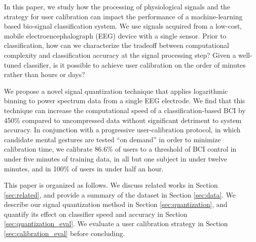 
In this paper, we study how the processing of physiological signals and the strategy for user calibration can impact the performance of a machine-learning based bio-signal classification system. We use signals acquired from a low-cost, mobile electroencephalograph (EEG) device with a single sensor. Prior to classification, how can we characterize the tradeoff between computational complexity and classification accuracy at the signal processing step? Given a well-tuned classifier, is it possible to achieve user calibration on the order of minutes rather than hours or days?


We propose a novel signal quantization technique that applies logarithmic binning to power spectrum data from a single EEG electrode. We find that this technique can increase the computational speed of a classification-based BCI by 450\% compared to uncompressed data without significant detriment to system accuracy. In conjunction with a progressive user-calibration protocol, in which candidate mental gestures are tested ``on demand'' in order to minimize calibration time, we calibrate 86.6\% of users to a threshold of BCI control in under five minutes of training data, in all but one subject in under twelve minutes, and in 100\% of users in under half an hour. 

This paper is organized as follows. We discuss related works in Section \ref{sec:related}, and provide a summary of the dataset in Section \ref{sec:data}. We describe our signal quantization method in Section \ref{sec:quantization}, and quantify its effect on classifier speed and accuracy in Section \ref{sec:quantization_eval}. We evaluate a user calibration strategy in Section \ref{sec:calibration_eval} before concluding.
